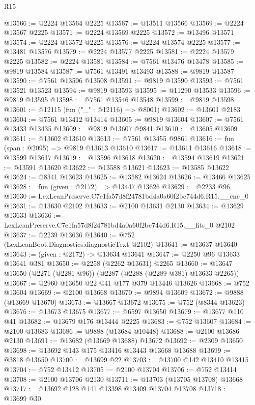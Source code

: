 \begin{lexlean}{R15}
\begin{coremodule}
@13566 := @2224 @13564 @2225
@13567 := @13511 @13566
@13569 := @2224 @13567 @2225
@13571 := @2224 @13569 @2225
@13572 := @13496 @13571
@13574 := @2224 @13572 @2225
@13576 := @2224 @13574 @2225
@13577 := @13481 @13576
@13579 := @2224 @13577 @2225
@13581 := @2224 @13579 @2225
@13582 := @2224 @13581
@13584 := @7561 @13476 @13478
@13585 := @9819 @13584
@13587 := @7561 @13491 @13493
@13588 := @9819 @13587
@13590 := @7561 @13506 @13508
@13591 := @9819 @13590
@13593 := @7561 @13521 @13523
@13594 := @9819 @13593
@13595 := @11290 @13533
@13596 := @9819 @13595
@13598 := @7561 @13546 @13548
@13599 := @9819 @13598
@13601 := @12115 (fun ("_" : @12116) => @8001)
@13602 := @13601 @2183
@13604 := @7561 @13412 @13414
@13605 := @9819 @13604
@13607 := @7561 @13433 @13435
@13609 := @9819 @13607 @9841
@13610 := @13605 @13609
@13611 := @13602 @13610
@13613 := @7561 @13455 @9861
@13616 := fun (span : @2095) => @9819 @13613 @13610
@13617 := @13611 @13616
@13618 := @13599 @13617
@13619 := @13596 @13618
@13620 := @13594 @13619
@13621 := @13591 @13620
@13622 := @13588 @13621
@13623 := @13585 @13622
@13624 := @8341 @13623
@13625 := @13582 @13624
@13626 := @13466 @13625
@13628 := fun (given : @2172) => @13447 @13626
@13629 := @2233 @96
@13630 := LexLeanPreserve.C7e1fa57d8f24781bd4a0a60f2bc744d6.R15.__enc_0
@13631 := @13630 @2102
@13633 := @2100 @13631 @2130
@13634 := @13629 @13633
@13636 := LexLeanPreserve.C7e1fa57d8f24781bd4a0a60f2bc744d6.R15.__fits_0 @2102
@13637 := @2239 @13636
@13640 := @752 (LexLeanBoot.Diagnostics.diagnosticText @2102)
@13641 := @13637 @13640
@13643 := (given : @2172) -> @13634 @13641
@13647 := @2250 @96 @13633 @13641 @381
@13650 := @2258 (@2262 @13631) @2265
@13660 := @13647 @13650 (@2271 (@2281 @96)) (@2287 (@2288 (@2289 @381) @13633 @2265))
@13667 := @2960 @13650 @22 @41 @177 @379 @13446 @13626
@13668 := @752 @13604
@13669 := @2100 @13668
@13670 := @9894 @13609
@13672 := @9888 (@13669 @13670)
@13673 := @13667 @13672
@13675 := @752 (@8344 @13623)
@13676 := @13673 @13675
@13677 := @6597 @13650
@13679 := @13677 @110 @41
@13682 := @13679 @176 @13444 @2225
@13683 := @752 @13607
@13684 := @2100 @13683
@13686 := @9888 (@13684 @10448)
@13688 := @2100 @13686 @2130
@13691 := @13682 (@13669 @13688) @13672
@13692 := @2309 @13650
@13698 := @13692 @143 @175 @13416 @13443 @13668 @13688
@13699 := @3818 @13650
@13700 := @13699 @22
@13703 := @13700 @142 @13410 @13415
@13704 := @752 @13412
@13705 := @2100 @13704
@13706 := @752 @13414
@13708 := @2100 @13706 @2130
@13711 := @13703 (@13705 @13708) @13668
@13717 := @13692 @128 @141 @13398 @13409 @13704 @13708
@13718 := @13699 @30

\end{coremodule}
\end{lexlean}
